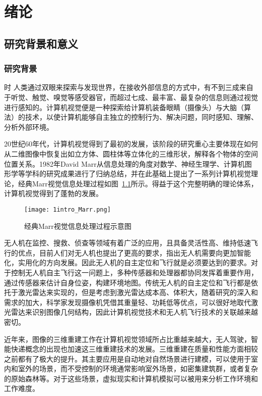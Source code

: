 \chapter{绪论}
\label{cha:chap1}
\section{研究背景和意义}
\label{sec:1.1}
\subsection{研究背景}时
\label{sec:1.1.1}
人类通过双眼来探索与发现世界，在接收外部信息的方式中，有不到三成来自于听觉、触觉、嗅觉等感受器官，而超过七成、最丰富、最复杂的信息则通过视觉进行感知的。计算机视觉便是一种探索给计算机装备眼睛（摄像头）与大脑（算法）的技术，以使计算机能够自主独立的控制行为、解决问题，同时感知、理解、分析外部环境。

20世纪60年代，计算机视觉得到了最初的发展，该阶段的研究重心主要体现在如何从二维图像中恢复出如立方体、圆柱体等立体化的三维形状，解释各个物体的空间位置关系。1982年David Marr从信息处理的角度对数学、神经生理学、计算机图形学等学科的研究成果进行了归纳总结，并在此基础上提出了一系列计算机视觉理论，经典Marr视觉信息处理过程如图~\ref{fig:introduction_Marr}所示。得益于这个完整明确的理论体系，计算机视觉得到了蓬勃的发展。
\begin{figure}[H] %
  \centering
  \texttt{[image: 1intro\_Marr.png]}
  \caption{经典Marr视觉信息处理过程示意图}
  \label{fig:introduction_Marr}
\end{figure}
无人机在监控、搜救、侦查等领域有着广泛的应用，且具备灵活性高、维持低速飞行的优点，目前人们对无人机也提出了更高的要求，指出无人机需要向更加智能化，实用化的方向发展。因此无人机的自主定位和飞行就是必须要达到的要求。对于控制无人机自主飞行这一问题上，多种传感器和处理器都协同发挥着重要作用，通过传感器来估计自身位姿，构建环境地图。传统无人机的自主定位和飞行都是依托于激光雷达来实现的，但是考虑到激光雷达成本高、体积大，随着研究的深入和需求的加大，科学家发现摄像机凭借其重量轻、功耗低等优点，可以很好地取代激光雷达来识别图像几何结构，因此计算机视觉技术和无人机飞行技术的关联越来越密切。

近年来，图像的三维重建工作在计算机视觉领域所占比重越来越大，无人驾驶，智能快递概念的出现也加速这三维重建技术的发展。三维重建在质量和性能方面相较之前都有了极大的提升。其主要应用是自动地对自然场景进行建模，可以使用于室内和室外的场景，而不受控制的环境通常影响室外场景，如密集建筑群，或者复杂的原始森林等。对于这些场景，虚拟现实和计算机模拟可以被用来分析工作环境和工作难度。

